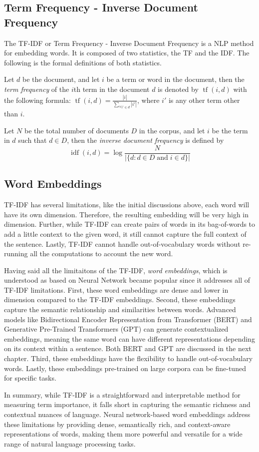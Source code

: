 \subsection{Term Frequency - Inverse Document Frequency}
The TF-IDF or Term Frequency - Inverse Document Frequency is a NLP method for embedding words. It is composed of two statistics, the TF and the IDF. The following is the formal definitions of both statistics.
\begin{defnx}
Let $d$ be the document, and let $i$ be a term or word in the document, then the \textit{term frequency} of the $i$th term in the document $d$ is denoted by $\operatorname{tf}(i,d)$ with the following formula: $\operatorname{tf}(i,d)=\displaystyle\frac{|i|}{\sum_{\forall i'\in d}|i'|}$, where $i'$ is any other term other than $i$.
\end{defnx}
\begin{defnx}
Let $N$ be the total number of documents $D$ in the corpus, and let $i$ be the term in $d$ such that $d\in D$, then the \textit{inverse document frequency} is defined by
\begin{equation}
    \operatorname{idf}(i,d)=\log\frac{N}{|\{d:d\in D\;\text{and}\;i\in d\}|}
\end{equation}
\end{defnx}
\subsection{Word Embeddings}
TF-IDF has several limitations, like the initial discussions above, each word will have its own dimension. Therefore, the resulting embedding will be very high in dimension. Further, while TF-IDF can create pairs of words in its bag-of-words to add a little context to the given word, it still cannot capture the full context of the sentence. Lastly, TF-IDF cannot handle out-of-vocabulary words without re-running all the computations to account the new word.

Having said all the limitaitons of the TF-IDF, \textit{word embeddings}, which is understood as based on Neural Network became popular since it addresses all of TF-IDF limitations. First, these word embeddings are dense and lower in dimension compared to the TF-IDF embeddings. Second, these embeddings capture the semantic relationship and similarities between words. Advanced models like Bidirectional Encoder Representation from Transformer (BERT) and Generative Pre-Trained Transformers (GPT) can generate contextualized embeddings, meaning the same word can have different representations depending on its context within a sentence. Both BERT and GPT are discussed in the next chapter. Third, these embeddings have the flexibility to handle out-of-vocabulary words. Lastly, these embeddings pre-trained on large corpora can be fine-tuned for specific tasks.

In summary, while TF-IDF is a straightforward and interpretable method for measuring term importance, it falls short in capturing the semantic richness and contextual nuances of language. Neural network-based word embeddings address these limitations by providing dense, semantically rich, and context-aware representations of words, making them more powerful and versatile for a wide range of natural language processing tasks.